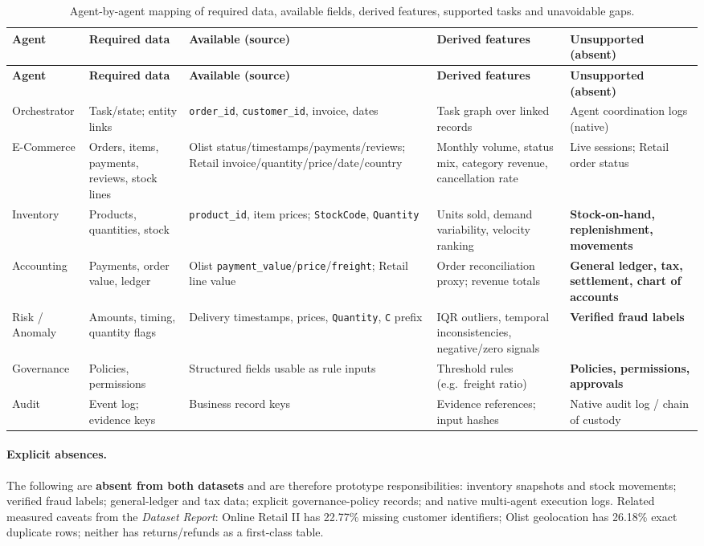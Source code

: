 \documentclass[11pt,a4paper]{article}
\newcommand{\code}[1]{\texttt{#1}}
\begin{document}
\begin{longtable}{L{2.15cm}L{3.0cm}L{2.6cm}L{3.1cm}L{3.1cm}}
\caption{Agent-by-agent mapping of required data, available fields, derived features, supported tasks and unavoidable gaps.}\label{tab:map}\\
\toprule
\textbf{Agent} & \textbf{Required data} & \textbf{Available (source)} & \textbf{Derived features} & \textbf{Unsupported (absent)} \\
\midrule
\endfirsthead
\toprule
\textbf{Agent} & \textbf{Required data} & \textbf{Available (source)} & \textbf{Derived features} & \textbf{Unsupported (absent)} \\
\midrule
\endhead
Orchestrator & Task/state; entity links & \code{order\_id}, \code{customer\_id}, invoice, dates & Task graph over linked records & Agent coordination logs (native) \\
E-Commerce & Orders, items, payments, reviews, stock lines & Olist status/\allowbreak timestamps/\allowbreak payments/\allowbreak reviews; Retail invoice/\allowbreak quantity/\allowbreak price/\allowbreak date/\allowbreak country & Monthly volume, status mix, category revenue, cancellation rate & Live sessions; Retail order status \\
Inventory & Products, quantities, stock & \code{product\_id}, item prices; \code{StockCode}, \code{Quantity} & Units sold, demand variability, velocity ranking & \textbf{Stock-on-hand, replenishment, movements} \\
Accounting & Payments, order value, ledger & Olist \code{payment\_value}/\allowbreak\code{price}/\allowbreak\code{freight}; Retail line value & Order reconciliation proxy; revenue totals & \textbf{General ledger, tax, settlement, chart of accounts} \\
Risk / Anomaly & Amounts, timing, quantity flags & Delivery timestamps, prices, \code{Quantity}, \code{C} prefix & IQR outliers, temporal inconsistencies, negative/\allowbreak zero signals & \textbf{Verified fraud labels} \\
Governance & Policies, permissions & Structured fields usable as rule inputs & Threshold rules (e.g.\ freight ratio) & \textbf{Policies, permissions, approvals} \\
Audit & Event log; evidence keys & Business record keys & Evidence references; input hashes & Native audit log / chain of custody \\
\bottomrule
\end{longtable}

\paragraph{Explicit absences.} The following are \textbf{absent from both datasets} and are therefore prototype responsibilities: inventory snapshots and stock movements; verified fraud labels; general-ledger and tax data; explicit governance-policy records; and native multi-agent execution logs. Related measured caveats from the \emph{Dataset Report}: Online Retail II has 22.77\% missing customer identifiers; Olist geolocation has 26.18\% exact duplicate rows; neither has returns/refunds as a first-class table.
\end{document}
